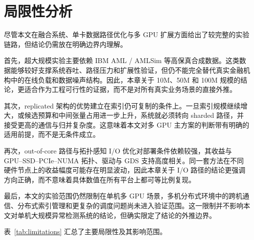 \section{局限性分析}

尽管本文在融合系统、单卡数据路径优化与多 GPU 扩展方面给出了较完整的实验链路，但结论仍需放在明确边界内理解。

首先，超大规模实验主要依赖 IBM AML / AMLSim 等高保真合成数据。这类数据能够较好支撑系统吞吐、路径压力和扩展性验证，但仍不能完全替代真实金融机构中的在线负载和数据噪声结构。因此，本章关于 10M、50M 和 100M 规模的结论，更适合作为工程可行性的证据，而不是对所有真实业务场景的直接外推。

其次，replicated 架构的优势建立在索引仍可复制的条件上。一旦索引规模继续增大，或候选预算和中间张量占用进一步上升，系统就必须转向 sharded 路径，并接受更高的通信与归并复杂度。这意味着本文对多 GPU 主方案的判断带有明确的适用前提，而不是无条件成立。

再次，out-of-core 路径与拓扑感知 I/O 优化对部署条件依赖较强，其收益与 GPU--SSD--PCIe--NUMA 拓扑、驱动与 GDS 支持高度相关。同一套方法在不同硬件节点上的收益幅度可能存在明显波动，因此本章关于 I/O 路径的结论更强调方向正确，而不意味着具体数值在所有平台上都可等比例复现。

最后，本文的实验范围仍然限制在单机多 GPU 场景，多机分布式环境中的跨机通信、分布式索引管理和更复杂的调度问题尚未进入验证范围。这一限制并不影响本文对单机大规模异常检测系统的结论，但确实限定了结论的外推边界。

表~\ref{tab:limitations} 汇总了主要局限性及其影响范围。

